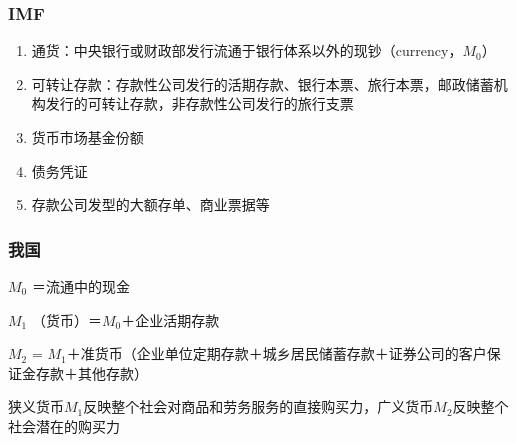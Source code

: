 \documentclass[12pt]{book}
\begin{document}

\subsubsection{IMF}

\begin{enumerate}[1.]
    \item 通货：中央银行或财政部发行流通于银行体系以外的现钞（currency，$M_0$）
    \item 可转让存款：存款性公司发行的活期存款、银行本票、旅行本票，邮政储蓄机构发行的可转让存款，非存款性公司发行的旅行支票
    \item 货币市场基金份额
    \item 债务凭证
    \item 存款公司发型的大额存单、商业票据等
\end{enumerate}

\subsubsection{我国}

\par $M_0$ ＝流通中的现金
\par $M_1$ （货币）＝$M_0$＋企业活期存款
\par $M_2$ = $M_1$＋准货币（企业单位定期存款＋城乡居民储蓄存款＋证券公司的客户保证金存款＋其他存款）
\par 狭义货币$M_1$反映整个社会对商品和劳务服务的直接购买力，广义货币$M_2$反映整个社会潜在的购买力
\end{document}
